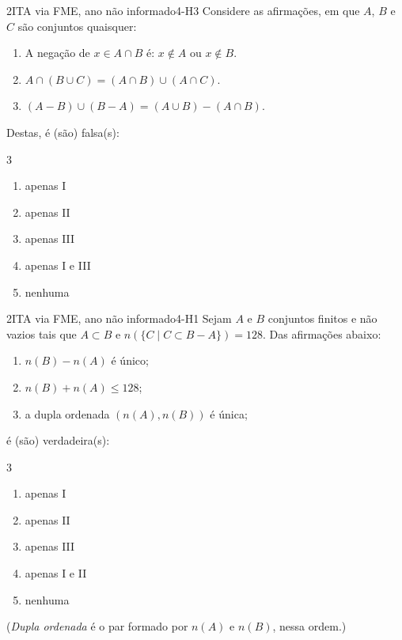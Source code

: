 \begin{questao}{2}{ITA via FME, ano não informado}{4-H3}\label{u4:ita44}
Considere as afirmações, em que $A$, $B$ e $C$ são conjuntos quaisquer:
\begin{enumerate}[label=\Roman*.]
  \item A negação de $x\in A\cap B$ é: $x\notin A$ ou $x\notin B$.
  \item $A\cap(B\cup C)=(A\cap B)\cup(A\cap C)$.
  \item $(A-B)\cup(B-A)=(A\cup B)-(A\cap B)$.
\end{enumerate}
Destas, é (são) falsa(s):
\begin{multicols}{3}
\begin{enumerate}[label=\alph*)]
  \item apenas I
  \item apenas II
  \item apenas III
  \item apenas I e III
  \item nenhuma
\end{enumerate}
\end{multicols}
\end{questao}

\begin{questao}[integradora]{2}{ITA via FME, ano não informado}{4-H1}\label{u4:ita46}
Sejam $A$ e $B$ conjuntos finitos e não vazios tais que $A\subset B$ e $n(\{C\mid C\subset B-A\})=128$. Das afirmações abaixo:
\begin{enumerate}[label=\Roman*.]
  \item $n(B)-n(A)$ é único;
  \item $n(B)+n(A)\le 128$;
  \item a dupla ordenada $(n(A),n(B))$ é única;
\end{enumerate}
é (são) verdadeira(s):
\begin{multicols}{3}
\begin{enumerate}[label=\alph*)]
  \item apenas I
  \item apenas II
  \item apenas III
  \item apenas I e II
  \item nenhuma
\end{enumerate}
\end{multicols}
(\emph{Dupla ordenada} é o par formado por $n(A)$ e $n(B)$, nessa ordem.)
\end{questao}

